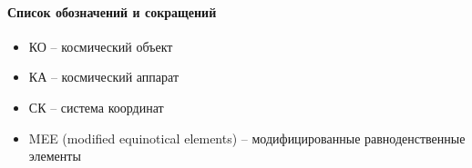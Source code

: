 \paragraph{Список обозначений и сокращений}

\begin{itemize}
    \item КО -- космический объект
    \item КА -- космический аппарат
    \item СК -- система координат
    \item MEE (modified equinotical elements) -- модифицированные равноденственные элементы
\end{itemize}

\newpage